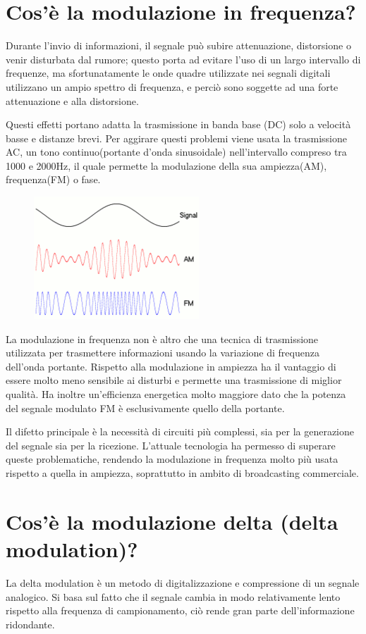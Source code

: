 \section{Cos’è la modulazione in frequenza?}
Durante l’invio di informazioni, il segnale può subire attenuazione, distorsione o venir disturbata dal rumore; questo porta ad evitare l’uso di un largo intervallo di frequenze, ma sfortunatamente le onde quadre utilizzate nei segnali digitali utilizzano un ampio spettro di frequenza, e perciò sono soggette ad una forte attenuazione e alla distorsione.

Questi effetti portano adatta la trasmissione in banda base (DC) solo a velocità basse e distanze brevi.
Per aggirare questi problemi viene usata la trasmissione AC, un tono continuo(portante d’onda sinusoidale) nell’intervallo compreso tra 1000 e 2000Hz, il quale permette la modulazione della sua ampiezza(AM), frequenza(FM) o fase.

\begin{figure}[H]
\centering
\includegraphics[scale=1]{res/img/5_modulazione.png}
\end{figure}
 
La modulazione in frequenza non è altro che una tecnica di trasmissione utilizzata per trasmettere informazioni usando la variazione di frequenza dell’onda portante. Rispetto alla modulazione in ampiezza ha il vantaggio di essere molto meno sensibile ai disturbi e permette una trasmissione di miglior qualità. Ha inoltre un’efficienza energetica molto maggiore dato che la potenza del segnale modulato FM è esclusivamente quello della portante.

Il difetto principale è la necessità di circuiti più complessi, sia per la generazione del segnale sia per la ricezione. L’attuale tecnologia ha permesso di superare queste problematiche, rendendo la modulazione in frequenza molto più usata rispetto a quella in ampiezza, soprattutto in ambito di broadcasting commerciale.

\section{Cos’è la modulazione delta (delta modulation)?}
La delta modulation è un metodo di digitalizzazione e compressione di un segnale analogico.
Si basa sul fatto che il segnale cambia in modo relativamente lento rispetto alla frequenza di campionamento, ciò rende gran parte dell’informazione ridondante.

